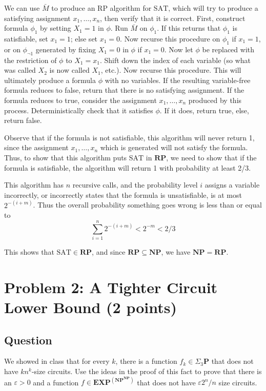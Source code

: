 \documentclass{article}
\renewcommand{\P}{\mathbf{P}}
\newcommand{\NP}{\mathbf{NP}}
\newcommand{\EXP}{\mathbf{EXP}}
\newcommand{\RP}{\mathbf{RP}}
\def \eps {{\varepsilon}}
\begin{document}
We can use $\bar{M}$ to produce an RP algorithm for $\text{SAT}$, which will try to produce a satisfying assignment $x_1, \dots, x_n$, then verify that it is correct.
First, construct formula $\phi_1$ by setting $X_1 = 1$ in $\phi$.  Run $\bar{M}$ on $\phi_1$.
If this returns that $\phi_1$ is satisfiable, set $x_1 = 1$; else set $x_1 = 0$.
Now recurse this procedure on $\phi_1$ if $x_1 = 1$, or on $\phi_{\neg 1}$ generated by
fixing $X_1 = 0$ in $\phi$ if $x_1 = 0$.
Now let $\phi$ be replaced with the restriction of $\phi$ to $X_1 = x_1$.
Shift down the index of each variable (so what was called $X_2$ is now called $X_1$, etc.).
Now recurse this procedure.
This will ultimately produce a formula $\phi$ with no variables.
If the resulting variable-free formula reduces to false, return that there is no satisfying
assignment.
If the formula reduces to true, consider the assignment $x_1, \dots, x_n$ produced by this process.
Deterministically check that it satisfies $\phi$.
If it does, return true, else, return false.

Observe that if the formula is not satisfiable, this algorithm will never return 1, since the assignment $x_1, \dots, x_n$ which is generated will not satisfy the formula.
Thus, to show that this algorithm puts $\text{SAT}$ in $\RP$, we need to show that if the formula is satisfiable, the algorithm will return 1 with probability at least 2/3.

This algorithm has $n$ recursive calls, and the probability level $i$ assigns a variable incorrectly, or incorrectly states that the formula is unsatisfiable, is at most $2^{-(i + m)}$.
Thus the overall probability something goes wrong is less than or equal to
$$
\sum_{i=1}^n{2^{-(i + m)}} < 2^{-m} < 2/3
$$

\noindent This shows that $\text{SAT} \in \RP$, and since $\RP \subseteq \NP$, we have $\NP = \RP$.


\newpage
\section*{Problem 2: A Tighter Circuit Lower Bound (2 points)}

\subsection*{Question}

We showed in class that for every $k$, there is a function $f_k \in \Sigma_3 \P$ that does not have $k n^k$-size circuits. Use the ideas in the proof of this fact to prove that there is an $\eps > 0$ and a function $f \in \EXP^{(\NP^{\NP})}$ that does not have $\eps 2^n/n$ size circuits.
\end{document}
